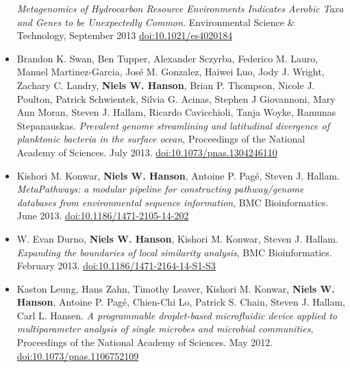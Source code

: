 \documentclass[print]{hanson_cv} %
\begin{document}
\begin{itemize}
   \emph{Metagenomics of Hydrocarbon Resource Environments Indicates Aerobic
  Taxa and Genes to be Unexpectedly Common.} Environmental Science
  \& Technology, September 2013
  \href{http://dx.doi.org/10.1021/es4020184}{doi:10.1021/es4020184}
\item
  Brandon K. Swan, Ben Tupper, Alexander Sczyrba, Federico M. Lauro,
  Manuel Martinez-Garcia, Jos\'{e} M. Gonzalez, Haiwei Luo, Jody J. Wright,
  Zachary C. Landry, \textbf{Niels W. Hanson}, Brian P. Thompson, Nicole
  J. Poulton, Patrick Schwientek, Silvia G. Acinas, Stephen J
  Giovannoni, Mary Ann Moran, Steven J. Hallam, Ricardo Cavicchioli,
  Tanja Woyke, Ramunas Stepanauskas. \emph{Prevalent genome streamlining
  and latitudinal divergence of planktonic bacteria in the surface
  ocean}, Proceedings of the National Academy of Sciences. July 2013.
  \href{http://dx.doi.org/10.1073/pnas.1304246110}{doi:10.1073/pnas.1304246110}
\item
  Kishori M. Konwar, \textbf{Niels W. Hanson}, Antoine P. Pag\'{e}, Steven
  J. Hallam. \emph{MetaPathways: a modular pipeline for constructing
  pathway/genome databases from environmental sequence information}, BMC
  Bioinformatics. June 2013. \href{http://dx.doi.org/10.1186/1471-2105-14-202}{doi:10.1186/1471-2105-14-202}
\item
  W. Evan Durno, \textbf{Niels W. Hanson}, Kishori M. Konwar, Steven J.
  Hallam. \emph{Expanding the boundaries of local similarity analysis}, BMC Bioinformatics.
  February 2013. \href{http://dx.doi.org/10.1186/1471-2164-14-S1-S3}{doi:10.1186/1471-2164-14-S1-S3}
\item
  Kaston Leung, Hans Zahn, Timothy Leaver, Kishori M. Konwar,
  \textbf{Niels W. Hanson}, Antoine P. Pag\'{e}, Chien-Chi Lo, Patrick S.
  Chain, Steven J. Hallam, Carl L. Hansen. \emph{A programmable
  droplet-based microfluidic device applied to multiparameter analysis
  of single microbes and microbial communities}, Proceedings of the
  National Academy of Sciences. May 2012.
  \href{http://dx.doi.org/10.1073/pnas.1106752109}{doi:10.1073/pnas.1106752109}
\end{itemize}
\end{document}
